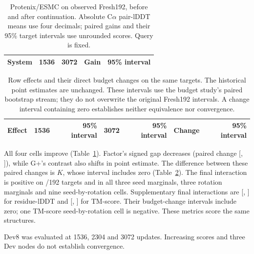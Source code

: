 \begin{table}[!htbp]\centering\small
\caption{Protenix/ESMC on observed Fresh192, before and after continuation.
Absolute C$\alpha$ pair-lDDT means use four decimals; paired gains and their
95\% target intervals use unrounded scores. Query is fixed.}
\label{tab:budget_means}
\begin{tabular}{lrrrr}\toprule
System & 1536 & 3072 & Gain & 95\% interval \\\midrule

\end{tabular}\end{table}

\begin{table}[!htbp]\centering\footnotesize
\caption{Row effects and their direct budget changes on the same targets.
The historical point estimates are unchanged. These intervals use the budget
study's paired bootstrap stream; they do not overwrite the original Fresh192
intervals. A change interval containing zero establishes neither equivalence
nor convergence.}
\label{tab:budget_effects}
\setlength{\tabcolsep}{1.5pt}
\begin{tabular}{@{}lrrrrrr@{}}\toprule
Effect & 1536 & 95\% interval & 3072 & 95\% interval & Change & 95\% interval \\\midrule

\end{tabular}\end{table}

All four cells improve (Table~\ref{tab:budget_means}). Factor's signed gap decreases
(paired change 
[, ]),
while G+'s contrast also shifts in point estimate. The difference between these
paired changes is $K$, whose interval includes
zero (Table~\ref{tab:budget_effects}). The final interaction is positive on
/192 targets and in all three seed marginals, three
rotation marginals and nine seed-by-rotation cells. Supplementary final
interactions are 
[, ] for residue-lDDT
and  [, ]
for TM-score. Their budget-change intervals include zero; one TM-score
seed-by-rotation cell is negative. These metrics score the same structures.

Dev8 was evaluated at 1536, 2304 and 3072 updates. Increasing scores and
three Dev nodes do not establish convergence.

